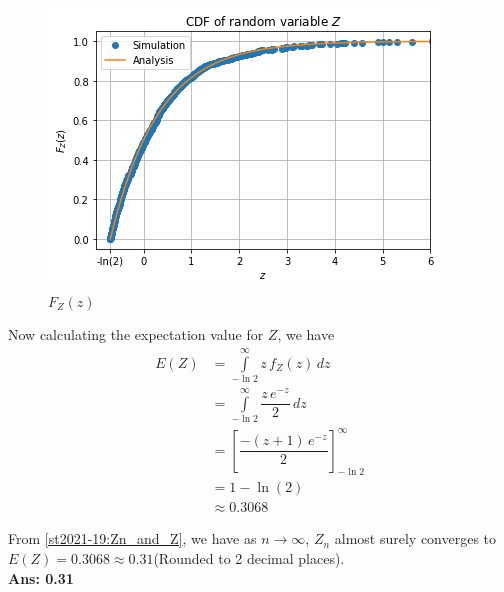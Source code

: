 \begin{figure}[H]
    \centering
      \includegraphics[width=\columnwidth]{solutions/st/2021/19/Figures/CDF_Z.png}
     \caption{$F_Z(z)$}
\end{figure}
Now calculating the expectation value for $Z$, we have
\begin{align}
    E(Z)&=\int\limits_{-\ln{2}}^{\infty}z\,f_Z(z)\,dz\\
    &=\int\limits_{-\ln{2}}^{\infty}\dfrac{z\,e^{-z}}{2}\,dz\\
    &=\left[ \dfrac{-(z+1)\,e^{-z}}{2} \right]_{-\ln{2}}^\infty\\
    &=1-\ln{(2)}\\
    &\approx0.3068
\end{align}
\par From \eqref{st2021-19:Zn_and_Z}, we have as $n \to \infty$, $Z_n$  almost surely converges to $ E(Z)=0.3068\approx0.31$(Rounded to 2 decimal places).\\
\textbf{Ans: 0.31}

